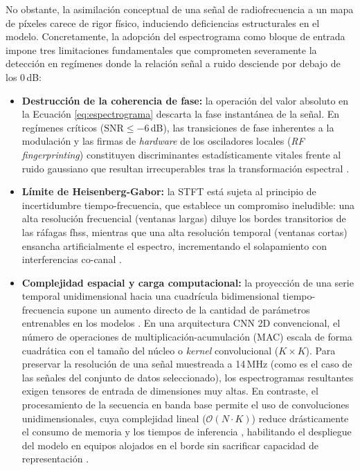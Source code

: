No obstante, la asimilación conceptual de una señal de radiofrecuencia a un mapa de píxeles carece de rigor físico, induciendo deficiencias estructurales en el modelo. Concretamente, la adopción del espectrograma como bloque de entrada impone tres limitaciones fundamentales que comprometen severamente la detección en regímenes donde la relación señal a ruido desciende por debajo de los 0\,dB:

\begin{itemize}
    \item \textbf{Destrucción de la coherencia de fase:} la operación del valor absoluto en la Ecuación \ref{eq:espectrograma} descarta la fase instantánea de la señal. En regímenes críticos ($\text{SNR} \le -6$\,dB), las transiciones de fase inherentes a la modulación y las firmas de \textit{hardware} de los osciladores locales (\textit{RF fingerprinting}) constituyen discriminantes estadísticamente vitales frente al ruido gaussiano que resultan irrecuperables tras la transformación espectral \cite{zheng_deep_2025}.
    \item \textbf{Límite de Heisenberg-Gabor:} la STFT está sujeta al principio de incertidumbre tiempo-frecuencia, que establece un compromiso ineludible: una alta resolución frecuencial (ventanas largas) diluye los bordes transitorios de las ráfagas \gls{fhss}, mientras que una alta resolución temporal (ventanas cortas) ensancha artificialmente el espectro, incrementando el solapamiento con interferencias co-canal \cite{oppenheim_discrete_2014}.
    \item \textbf{Complejidad espacial y carga computacional:} la proyección de una serie temporal unidimensional hacia una cuadrícula bidimensional tiempo-frecuencia supone un aumento directo de la cantidad de parámetros entrenables en los modelos \cite{alam_rf-enabled_2023}. En una arquitectura CNN 2D convencional, el número de operaciones de multiplicación-acumulación (MAC) escala de forma cuadrática con el tamaño del núcleo o \textit{kernel} convolucional ($K \times K$). Para preservar la resolución de una señal muestreada a 14\,MHz (como es el caso de las señales del conjunto de datos seleccionado), los espectrogramas resultantes exigen tensores de entrada de dimensiones muy altas. En contraste, el procesamiento de la secuencia en banda base permite el uso de convoluciones unidimensionales, cuya complejidad lineal ($\mathcal{O}(N \cdot K)$) reduce drásticamente el consumo de memoria y los tiempos de inferencia \cite{zheng_deep_2025}, habilitando el despliegue del modelo en equipos alojados en el borde sin sacrificar capacidad de representación \cite{cai_toward_2024, zhang_edge_2023}.
\end{itemize}

